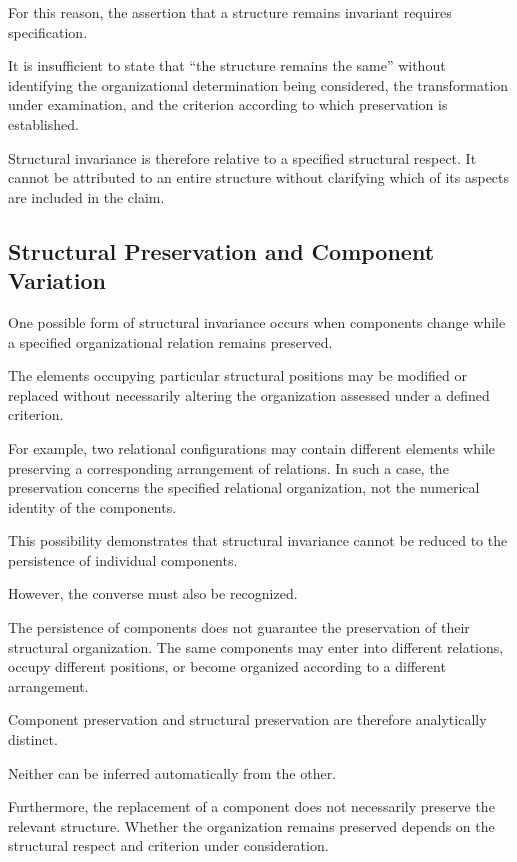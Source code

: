 For this reason, the assertion that a structure
remains invariant requires specification.

It is insufficient to state that ``the structure
remains the same'' without identifying the
organizational determination being considered,
the transformation under examination, and the
criterion according to which preservation is
established.

Structural invariance is therefore relative
to a specified structural respect. It cannot
be attributed to an entire structure without
clarifying which of its aspects are included
in the claim.

\subsection{Structural Preservation and Component Variation}

One possible form of structural invariance occurs
when components change while a specified
organizational relation remains preserved.

The elements occupying particular structural
positions may be modified or replaced without
necessarily altering the organization assessed
under a defined criterion.

For example, two relational configurations may
contain different elements while preserving
a corresponding arrangement of relations.
In such a case, the preservation concerns
the specified relational organization, not
the numerical identity of the components.

This possibility demonstrates that structural
invariance cannot be reduced to the persistence
of individual components.

However, the converse must also be recognized.

The persistence of components does not guarantee
the preservation of their structural organization.
The same components may enter into different
relations, occupy different positions, or become
organized according to a different arrangement.

Component preservation and structural preservation
are therefore analytically distinct.

Neither can be inferred automatically from the
other.

Furthermore, the replacement of a component
does not necessarily preserve the relevant
structure. Whether the organization remains
preserved depends on the structural respect
and criterion under consideration.

